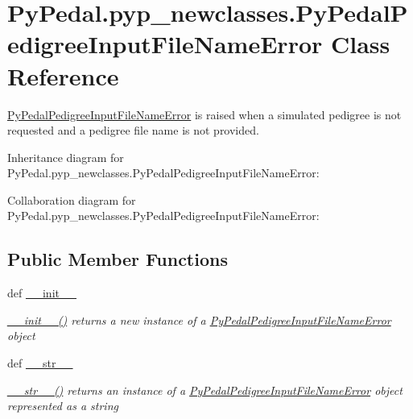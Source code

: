 \hypertarget{classPyPedal_1_1pyp__newclasses_1_1PyPedalPedigreeInputFileNameError}{
\section{PyPedal.pyp\_\-newclasses.PyPedalPedigreeInputFileNameError Class Reference}
\label{classPyPedal_1_1pyp__newclasses_1_1PyPedalPedigreeInputFileNameError}
}


\hyperlink{classPyPedal_1_1pyp__newclasses_1_1PyPedalPedigreeInputFileNameError}{PyPedalPedigreeInputFileNameError} is raised when a simulated pedigree is not requested and a pedigree file name is not provided.  




Inheritance diagram for PyPedal.pyp\_\-newclasses.PyPedalPedigreeInputFileNameError:


Collaboration diagram for PyPedal.pyp\_\-newclasses.PyPedalPedigreeInputFileNameError:
\subsection*{Public Member Functions}
\begin{DoxyCompactItemize}
\item 
def \hyperlink{classPyPedal_1_1pyp__newclasses_1_1PyPedalPedigreeInputFileNameError_a7b690886b81fead4dd46c9d2c77cc45f}{\_\-\_\-init\_\-\_\-}
\begin{DoxyCompactList}\small\item\em \hyperlink{classPyPedal_1_1pyp__newclasses_1_1PyPedalPedigreeInputFileNameError_a7b690886b81fead4dd46c9d2c77cc45f}{\_\-\_\-init\_\-\_\-()} returns a new instance of a \hyperlink{classPyPedal_1_1pyp__newclasses_1_1PyPedalPedigreeInputFileNameError}{PyPedalPedigreeInputFileNameError} object \end{DoxyCompactList}\item 
def \hyperlink{classPyPedal_1_1pyp__newclasses_1_1PyPedalPedigreeInputFileNameError_a36211de08dd7051cb0dafec75bfb5a2c}{\_\-\_\-str\_\-\_\-}
\begin{DoxyCompactList}\small\item\em \hyperlink{classPyPedal_1_1pyp__newclasses_1_1PyPedalPedigreeInputFileNameError_a36211de08dd7051cb0dafec75bfb5a2c}{\_\-\_\-str\_\-\_\-()} returns an instance of a \hyperlink{classPyPedal_1_1pyp__newclasses_1_1PyPedalPedigreeInputFileNameError}{PyPedalPedigreeInputFileNameError} object represented as a string \end{DoxyCompactList}\end{DoxyCompactItemize}
